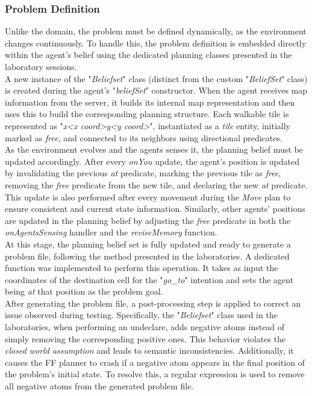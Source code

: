         \subsubsection{Problem Definition}
            Unlike the domain, the problem must be defined dynamically, as the environment changes continuously. To handle this, the problem definition is embedded directly within the agent's belief using the dedicated planning classes presented in the laboratory sessions.
            \medskip\\
            A new instance of the "\textit{Beliefset}" class (distinct from the custom "\textit{BeliefSet}" class) is created during the agent's "\textit{beliefSet}" constructor. When the agent receives map information from the server, it builds its internal map representation and then uses this to build the corresponding planning structure. Each walkable tile is represented as "\textit{x<x coord>y<y coord>}", instantiated as a \textit{tile} entity, initially marked as \textit{free}, and connected to its neighbors using directional predicates.
            \medskip\\
            As the environment evolves and the agents senses it, the planning belief must be updated accordingly. After every \textit{onYou} update, the agent's position is updated by invalidating the previous \textit{at} predicate, marking the previous tile as \textit{free}, removing the \textit{free} predicate from the new tile, and declaring the new \textit{at} predicate. This update is also performed after every movement during the \textit{Move} plan to ensure consistent and current state information. Similarly, other agents' positions are updated in the planning belief by adjusting the \textit{free} predicate in both the \textit{onAgentsSensing} handler and the \textit{reviseMemory} function.
            \medskip\\
            At this stage, the planning belief set is fully updated and ready to generate a problem file, following the method presented in the laboratories. A dedicated function was implemented to perform this operation. It takes as input the coordinates of the destination cell for the "\textit{go\_to}" intention and sets the agent being \textit{at} that position as the problem goal.
            \medskip\\
            After generating the problem file, a post-processing step is applied to correct an issue observed during testing. Specifically, the "\textit{Beliefset}" class used in the laboratories, when performing an undeclare, adds negative atoms instead of simply removing the corresponding positive ones. This behavior violates the \textit{closed world assumption} and leads to semantic inconsistencies. Additionally, it causes the FF planner to crash if a negative atom appears in the final position of the problem's initial state. To resolve this, a regular expression is used to remove all negative atoms from the generated problem file.

